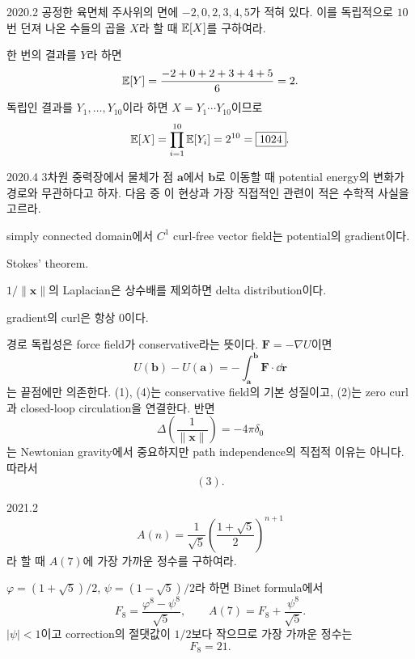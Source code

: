 \begin{pastproblem}{2020.2}
공정한 육면체 주사위의 면에 $-2,0,2,3,4,5$가 적혀 있다. 이를 독립적으로 $10$번 던져 나온 수들의 곱을 $X$라 할 때 $\mathbb{E}[X]$를 구하여라.
\end{pastproblem}

\begin{solution}
한 번의 결과를 $Y$라 하면
\[
\mathbb{E}[Y]=\frac{-2+0+2+3+4+5}{6}=2.
\]
독립인 결과를 $Y_1,\ldots,Y_{10}$이라 하면 $X=Y_1\cdots Y_{10}$이므로
\[
\mathbb{E}[X]=\prod_{i=1}^{10}\mathbb{E}[Y_i]=2^{10}=\boxed{1024}.
\]
\end{solution}

\begin{pastproblem}{2020.4}
3차원 중력장에서 물체가 점 $\mathbf a$에서 $\mathbf b$로 이동할 때 potential energy의 변화가 경로와 무관하다고 하자. 다음 중 이 현상과 가장 직접적인 관련이 적은 수학적 사실을 고르라.
\begin{problemchoices}
\item simply connected domain에서 $C^1$ curl-free vector field는 potential의 gradient이다.
\item Stokes' theorem.
\item $1/\|\mathbf x\|$의 Laplacian은 상수배를 제외하면 delta distribution이다.
\item gradient의 curl은 항상 $0$이다.
\end{problemchoices}
\end{pastproblem}

\begin{solution}
경로 독립성은 force field가 conservative라는 뜻이다. $\mathbf F=-\nabla U$이면
\[
U(\mathbf b)-U(\mathbf a)=-\int_{\mathbf a}^{\mathbf b}\mathbf F\cdot\dd\mathbf r
\]
는 끝점에만 의존한다. (1), (4)는 conservative field의 기본 성질이고, (2)는 zero curl과 closed-loop circulation을 연결한다. 반면
\[
\Delta\!\left(\frac1{\|\mathbf x\|}\right)=-4\pi\delta_0
\]
는 Newtonian gravity에서 중요하지만 path independence의 직접적 이유는 아니다. 따라서
\[
\boxed{(3)}.
\]
\end{solution}

\begin{pastproblem}{2021.2}
\[
A(n)=\frac1{\sqrt5}\left(\frac{1+\sqrt5}{2}\right)^{n+1}
\]
라 할 때 $A(7)$에 가장 가까운 정수를 구하여라.
\end{pastproblem}

\begin{solution}
$\varphi=(1+\sqrt5)/2$, $\psi=(1-\sqrt5)/2$라 하면 Binet formula에서
\[
F_8=\frac{\varphi^8-\psi^8}{\sqrt5},
\qquad
A(7)=F_8+\frac{\psi^8}{\sqrt5}.
\]
$|\psi|<1$이고 correction의 절댓값이 $1/2$보다 작으므로 가장 가까운 정수는
\[
\boxed{F_8=21}.
\]
\end{solution}

